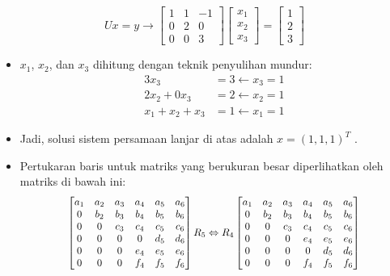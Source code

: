 \documentclass[pdflatex,compress,mathserif]{beamer}
\newcommand*{\Scale}[2][4]{\scalebox{#1}{$#2$}}%
\begin{document}
\begin{frame}
	\[ Ux = y \rightarrow \begin{bmatrix}
	1 & 1 & -1 \\
	0 & 2 & 0 \\
	0 & 0 & 3
	\end{bmatrix}
	\begin{bmatrix}
	x_1 \\ x_2 \\ x_3
	\end{bmatrix} = 
	\begin{bmatrix}
	1 \\ 2 \\ 3
	\end{bmatrix} \]
	
	\begin{itemize}
		\item $ x_1 $, $ x_2 $, dan $ x_3 $ dihitung dengan teknik penyulihan mundur:
		\begin{align*}
			3x_3 &= 3 \leftarrow x_3 = 1 \\
			2x_2 + 0x_3 &= 2 \leftarrow x_2 = 1 \\
			x_1 + x_2 + x_3 &= 1 \leftarrow x_1 = 1
		\end{align*}
		\item Jadi, solusi sistem persamaan lanjar di atas adalah $ x = (1, 1, 1)^T $ .
	\end{itemize}
\end{frame}

\begin{frame}
	\begin{itemize}
		\item Pertukaran baris untuk matriks yang berukuran besar diperlihatkan oleh matriks di bawah ini:
		\[\Scale[0.9]{
		\begin{bmatrix}
			a_1 & a_2 & a_3 & a_4 & a_5 & a_6 \\
			0 & b_2 & b_3 & b_4 & b_5 & b_6 \\
			0 & 0 & c_3 & c_4 & c_5 & c_6 \\
			0 & 0 & 0 & 0 & d_5 & d_6 \\
			0 & 0 & 0 & e_4 & e_5 & e_6 \\
			0 & 0 & 0 & f_4 & f_5 & f_6
		\end{bmatrix}
		R_5 \Leftrightarrow R_4
		\begin{bmatrix}
		a_1 & a_2 & a_3 & a_4 & a_5 & a_6 \\
		0 & b_2 & b_3 & b_4 & b_5 & b_6 \\
		0 & 0 & c_3 & c_4 & c_5 & c_6 \\
		0 & 0 & 0 & e_4 & e_5 & e_6 \\
		0 & 0 & 0 & 0 & d_5 & d_6 \\
		0 & 0 & 0 & f_4 & f_5 & f_6
		\end{bmatrix}
		}\]
	\end{itemize}
\end{frame}
\end{document}
